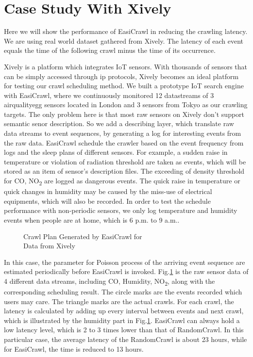 \documentclass[conference]{IEEEtran}
\begin{document}
\section{Case Study With Xively} \label{case_study}

Here we will show the performance of EasiCrawl in reducing the crawling latency. 
We are using real world dataset gathered from Xively.
The latency of each event equals the time of the following crawl minus the time of its occurrence.

Xively is a platform which integrates IoT sensors. 
With thousands of sensors that can be simply accessed through ip protocols, Xively becomes an ideal platform for testing our crawl scheduling method.
We built a prototype IoT search engine with EasiCrawl, where we continuously monitored 12 datastreams of 3 airqualityegg\cite{airegg} sensors located in London and 3 sensors from Tokyo as our crawling targets. 
The only problem here is that most raw sensors on Xively don't support semantic senor description. 
So we add a describing layer, which translate raw data streams to event sequences, by generating a log for interesting events from the raw data.
EasiCrawl schedule the crawler based on the event frequency from logs and the sleep plans of different sensors.
For example, a sudden raise in temperature or violation of radiation threshold are taken as events, which will be stored as an item of sensor's description files.
The exceeding of density threshold for CO, NO\textsubscript{2} are logged as dangerous events.
The quick raise in temperature or quick changes in humidity may be caused by the miss-use of electrical equipments, which will also be recorded.
In order to test the schedule performance with non-periodic sensors, we only log temperature and humidity events when people are at home, which is 6 p.m. to 9 a.m..

\begin{figure}
	\centering
	\hspace{-1.0em}
	
	\captionsetup{justification=centering}
	\caption{Crawl Plan Generated by EasiCrawl for \\
		Data from Xively}
	\vspace{-1.5em}
	\label{fig:xivelycasestudy}
\end{figure}

In this case, the parameter for Poisson process of the arriving event sequence are estimated periodically before EasiCrawl is invoked.
Fig.\ref{fig:xivelycasestudy} is the raw sensor data of 4 different data streams, including CO, Humidity, NO\textsubscript{2}, along with the corresponding scheduling result. 
The circle marks are the events recorded which users may care. 
The triangle marks are the actual crawls. 
For each crawl, the latency is calculated by adding up every interval between events and next crawl, which is illustrated by the humidity part in Fig.\ref{fig:xivelycasestudy}.
EasiCrawl can always hold a low latency level, which is 2 to 3 times lower than that of RandomCrawl.
In this particular case, the average latency of the RandomCrawl is about 23 hours, while for EasiCrawl, the time is reduced to 13 hours. 
\end{document}
